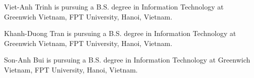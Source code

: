 \documentclass{ieeeaccess}
\begin{document}
\begin{IEEEbiography}{Viet-Anh Trinh} is pursuing a B.S. degree in Information Technology at Greenwich Vietnam, FPT University, Hanoi, Vietnam.
\end{IEEEbiography}

\begin{IEEEbiography}{Khanh-Duong Tran} is pursuing a B.S. degree in Information Technology at Greenwich Vietnam, FPT University, Hanoi, Vietnam.
\end{IEEEbiography}

\begin{IEEEbiography}{Son-Anh Bui} is pursuing a B.S. degree in Information Technology at Greenwich Vietnam, FPT University, Hanoi, Vietnam.
\end{IEEEbiography}

\EOD
\end{document}
